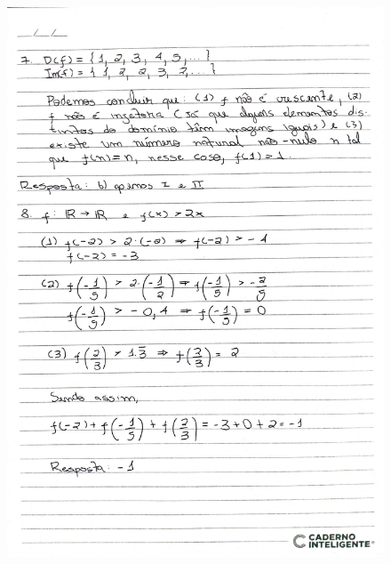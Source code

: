 \documentclass[
  12pt,     %
  openright,      %
  oneside,      %
  a4paper     %
  ]{abntex2}
\begin{document}
\begin{figure}[H]
  \centering
  \includegraphics[scale=0.23]{pagina15.jpg}
\end{figure}
\end{document}
